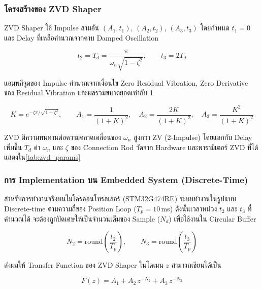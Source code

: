 \subsubsection{โครงสร้างของ ZVD Shaper}

ZVD Shaper ใช้ Impulse สามอัน $(A_1, t_1)$, $(A_2, t_2)$, $(A_3, t_3)$
โดยกำหนด $t_1 = 0$ และ Delay ที่เหลือคำนวณจากคาบ Damped Oscillation

\begin{equation}
    t_2 = T_d = \frac{\pi}{\omega_n\sqrt{1-\zeta^2}}, \qquad t_3 = 2T_d
    \label{eq:zv_t2}
\end{equation}

\noindent แอมพลิจูดของ Impulse คำนวณจากเงื่อนไข Zero Residual Vibration,
Zero Derivative ของ Residual Vibration และผลรวมขนาดยอดเท่ากับ 1

\begin{equation}
    K = e^{-\zeta\pi/\sqrt{1-\zeta^2}}, \qquad
    A_1 = \frac{1}{(1+K)^2}, \quad
    A_2 = \frac{2K}{(1+K)^2}, \quad
    A_3 = \frac{K^2}{(1+K)^2}
    \label{eq:zv_amplitudes}
\end{equation}

\noindent ZVD มีความทนทานต่อความคลาดเคลื่อนของ $\omega_n$ สูงกว่า ZV (2-Impulse)
โดยแลกกับ Delay เพิ่มขึ้น $T_d$
ค่า $\omega_n$ และ $\zeta$ ของ Connection Rod วัดจาก Hardware
และพารามิเตอร์ ZVD ที่ได้แสดงใน\cref{tab:zvd_params}

\subsubsection{การ Implementation บน Embedded System (Discrete-Time)}

สำหรับการทำงานจริงบนไมโครคอนโทรลเลอร์ (STM32G474RE) ระบบทำงานในรูปแบบ Discrete-time ตามความถี่ของ Position Loop ($T_p = 10$\,ms) 
ดังนั้นเวลาหน่วง $t_2$ และ $t_3$ ที่คำนวณได้ จะต้องถูกปัดเศษให้เป็นจำนวนเต็มของ Sample ($N_d$) เพื่อใช้งานใน Circular Buffer

\begin{equation}
    N_2 = \text{round}\left(\frac{t_2}{T_p}\right), \qquad N_3 = \text{round}\left(\frac{t_3}{T_p}\right)
    \label{eq:zvd_discrete_delay}
\end{equation}

\noindent ส่งผลให้ Transfer Function ของ ZVD Shaper ในโดเมน $z$ สามารถเขียนได้เป็น

\begin{equation}
    F(z) = A_1 + A_2\, z^{-N_2} + A_3\, z^{-N_3}
    \label{eq:zvd_transfer_function}
\end{equation}

